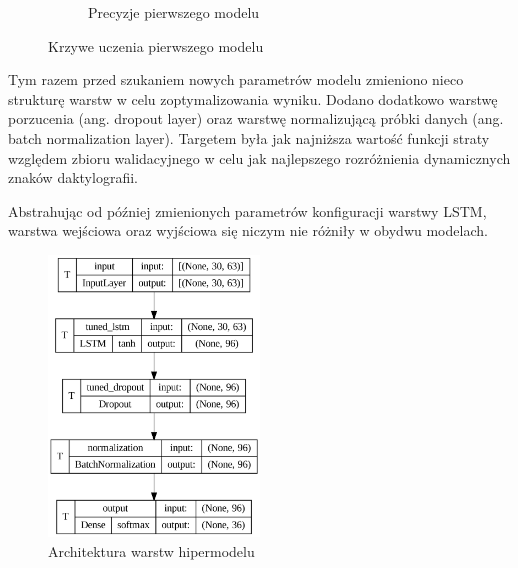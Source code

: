 \begin{figure}[H]
\begin{subfigure}[H]{0.49\textwidth}
        \caption{Precyzje pierwszego modelu}
        \label{fig:initial-accuracy}
    \end{subfigure}
    \caption{Krzywe uczenia pierwszego modelu}
    \label{fig:initial-loss-accuracy}
\end{figure}

Tym razem przed szukaniem nowych parametrów modelu zmieniono nieco strukturę warstw w celu zoptymalizowania wyniku. Dodano dodatkowo warstwę porzucenia (ang. dropout layer) oraz warstwę normalizującą próbki danych (ang. batch normalization layer). Targetem była jak najniższa wartość funkcji straty względem zbioru walidacyjnego w celu jak najlepszego rozróżnienia dynamicznych znaków daktylografii.

Abstrahując od później zmienionych parametrów konfiguracji warstwy LSTM, warstwa wejściowa oraz wyjściowa się niczym nie różniły w obydwu modelach.

\begin{figure}[H]
    \centering
    \includegraphics[width=0.5\textwidth]{figures/hypermodel-layers}
    \caption{Architektura warstw hipermodelu}
    \label{fig:hypermodel-layers}
\end{figure}

